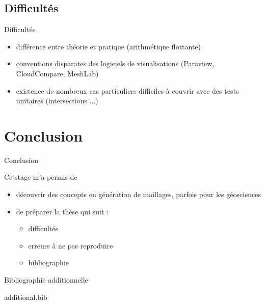 \documentclass[aspectratio=169, 12pt, a4paper, hyperref={pdfauthor={Alexandre MARIN}, pdfkeywords={IFPEN, Delaunay, Voronoi, mesh generation}, colorlinks=true, linkcolor=purple, urlcolor=blue, citecolor=magenta}]{beamer}
\begin{document}
\subsection{Difficultés}

\begin{Energie}{Difficultés}
\begin{itemize}
\item différence entre théorie et pratique (arithmétique flottante)
\item conventions disparates des logiciels de visualisations (Paraview, CloudCompare, MeshLab)
\item existence de nombreux cas particuliers difficiles à couvrir avec des tests unitaires (intersections $\dots$)
\end{itemize}
\end{Energie}

\section{Conclusion}
\begin{Energie}{Conclusion}

Ce stage m'a permis de

\begin{itemize}
\item découvrir des concepts en génération de maillages, parfois pour les géosciences
\item de préparer la thèse qui suit : 
\begin{itemize}
\item difficultés
\item erreurs à ne pas reproduire
\item bibliographie
\end{itemize}
\end{itemize}
\end{Energie}

\makeByeSlide

\begin{Energie}{\small Bibliographie additionnelle}

{\tiny
\begin{btSect}{additional.bib}
\btPrintNotCited
\end{btSect}}
\end{Energie}
\end{document}
